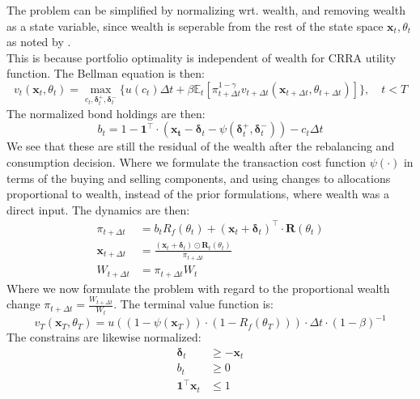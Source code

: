 \documentclass[11pt]{article}
\begin{document}
The problem can be simplified by normalizing wrt. wealth, and removing wealth as a state variable, since
wealth is seperable from the rest of the state space $\mathbf{x}_t , \theta_t$ as noted by \textcite{CaiJuddXu2013}.\\
This is because portfolio optimality is independent of wealth for CRRA utility function. 
The Bellman equation is then:
\begin{equation} \label{eq: class_bellman}
  v_{t} (\mathbf{x}_{t}, \theta_t) = \max_{c_t , \boldsymbol{\delta}^{+}_{t}, \boldsymbol{\delta}^{-}_{t} } \{ u(c_t) 
  \Delta t + \beta \mathbb{E}_{t} \left[ 
    \pi_{t+\Delta t}^{1-\gamma}
    v_{t+\Delta t} (\mathbf{x}_{t+\Delta t }, \theta_{t + \Delta t }  ) 
    \right] \} , \quad t < T 
\end{equation}
The normalized bond holdings are then:
\begin{equation}\label{eq: class_bond_holdings}
  b_{t} = 1 - \mathbf{1}^{\top} \cdot (\mathbf{x_t} - \boldsymbol{\delta}_t - \psi( \boldsymbol{\delta}^{+}_{t}, \boldsymbol{\delta}^{-}_{t}  )) - c_t \Delta t
\end{equation}
We see that these are still the residual of the wealth after the rebalancing and consumption decision.
Where we formulate the transaction cost function $\psi(\cdot)$ in terms of the buying and selling components,
and using changes to allocations proportional to wealth, instead of the prior formulations, where wealth was a direct input.
The dynamics are then:
\begin{align}
  \pi_{t+\Delta t} &= b_t R_f (\theta_t)  + (\mathbf{x}_t + \boldsymbol{\delta}_t)^{\top} \cdot \mathbf{R}(\theta_t) \\
  \mathbf{x}_{t+\Delta t} &=  \frac{(\mathbf{x}_t + \boldsymbol{\delta}_t) \odot \mathbf{R}_t (\theta_t )}{ \pi_{t+\Delta t} } \\
  W_{t+\Delta t} &= \pi_{t+\Delta t} W_t
\end{align}
Where we now formulate the problem with regard to the proportional wealth change $\pi_{t+\Delta t} = \frac{W_{t+\Delta t}}{W_t}$.
The terminal value function is:
\begin{equation} \label{eq: class_terminal_value}
  v_T (\mathbf{x}_T , \theta_T ) = u ( (1 - \psi(\mathbf{x}_T)) \cdot (1-R_f (\theta_T)) )\cdot \Delta t \cdot (1-\beta)^{-1} 
\end{equation}
The constrains are likewise normalized:
\begin{align}
  \boldsymbol{\delta}_t &\geq - \mathbf{x}_t \label{eq: No_Short_risky} \\
  b_t &\geq 0 \label{eq: No_Short_bonds}\\
  \mathbf{1}^{\top} \mathbf{x}_t &\leq 1 \label{eq: No_Geared_Risky}
\end{align}
\end{document}
